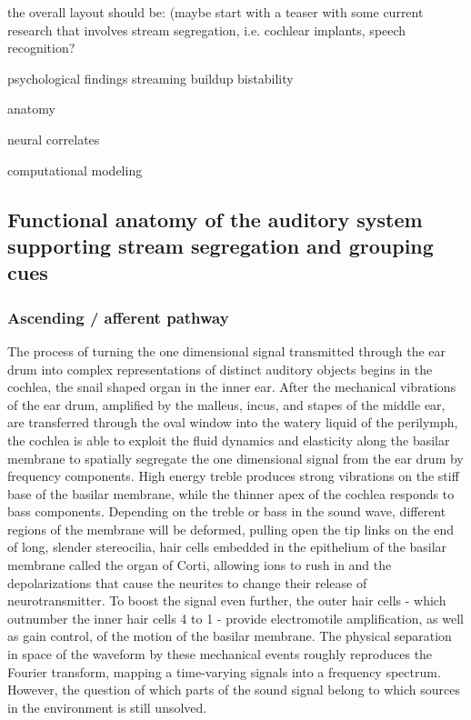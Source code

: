 the overall layout should be:
(maybe start with a teaser with some current research that involves stream segregation, i.e. cochlear implants, speech recognition?

psychological findings
streaming
buildup
bistability

anatomy

neural correlates

computational modeling

\subsection{Functional anatomy of the auditory system supporting stream segregation and grouping cues}

\subsubsection{Ascending / afferent pathway}
The process of turning the one dimensional signal transmitted through the ear drum into complex representations of distinct auditory objects begins in the cochlea, the snail shaped organ in the inner ear. After the mechanical vibrations of the ear drum, amplified by the malleus, incus, and stapes of the middle ear, are transferred through the oval window into the watery liquid of the perilymph, the cochlea is able to exploit the fluid dynamics and elasticity along the basilar membrane to spatially segregate the one dimensional signal from the ear drum by frequency components. High energy treble produces strong vibrations on the stiff base of the basilar membrane, while the thinner apex of the cochlea responds to bass components. Depending on the treble or bass in the sound wave, different regions of the membrane will be deformed, pulling open the tip links on the end of long, slender stereocilia, hair cells embedded in the epithelium of the basilar membrane called the organ of Corti, allowing ions to rush in and the depolarizations that cause the neurites to change their release of neurotransmitter. To boost the signal even further, the outer hair cells - which outnumber the inner hair cells 4 to 1 - provide electromotile amplification, as well as gain control, of the motion of the basilar membrane. The physical separation in space of the waveform by these mechanical events roughly reproduces the Fourier transform, mapping a time-varying signals into a frequency spectrum. However, the question of which parts of the sound signal belong to which sources in the environment is still unsolved.

